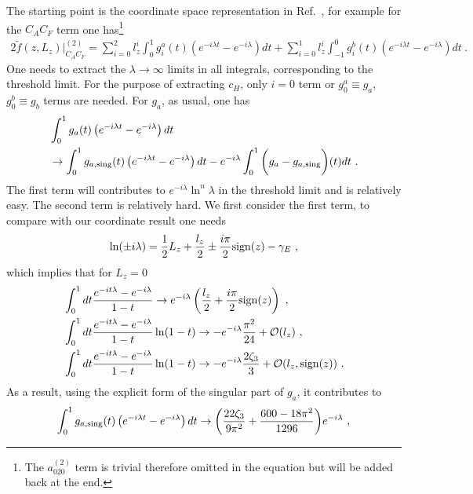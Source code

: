 \documentclass[a4paper,11pt]{article}
\begin{document}
The starting point is the coordinate space representation in Ref.~\cite{Li:2020xml}, for example for the $C_AC_F$ term one has\footnote{The $a_{020}^{(2)}$ term is trivial therefore omitted in the equation but will be added back at the end.}
\begin{align}
2\tilde f(z,L_z)|_{C_AC_F}^{(2)}=\sum_{i=0}^2l_z^i\int_{0}^1 g_i^a(t)\left(e^{-i\lambda t}-e^{-i\lambda}\right)dt+\sum_{i=0}^1l_z^i\int_{-1}^0 g_i^b(t)\left(e^{-i\lambda t}-e^{-i\lambda}\right)dt \ .
\end{align}
One needs to extract the $\lambda \rightarrow \infty$ limits in all integrals, corresponding to the threshold limit. For the purpose of extracting $c_H$, only $i=0$ term or $g^{a}_0\equiv g_a$, $g^{b}_0 \equiv g_b$ terms are needed. For $g_a$, as usual, one has
\begin{align}
&\int_{0}^1 g_a(t)\left(e^{-i\lambda t}-e^{-i\lambda}\right)dt\nonumber \\ 
&\rightarrow \int_{0}^1 g_{a,{\rm sing}}(t)\left(e^{-i\lambda t}-e^{-i\lambda}\right)dt-e^{-i\lambda}\int_{0}^1 \bigg(g_{a}-g_{a,{\rm sing}}\bigg)(t)dt \ .
\end{align}
The first term will contributes to $e^{-i\lambda}\ln^n \lambda$ in the  threshold limit and is relatively easy. The second term is relatively hard. We first consider the first term, to compare with our coordinate result one needs
\begin{align}
\ln (\pm i\lambda)=\frac{1}{2}L_z+\frac{l_z}{2} \pm \frac{i\pi}{2}{\rm sign}(z)-\gamma_E \ ,
\end{align}
which implies that for $L_z=0$
\begin{align}
&\int_{0}^{1} dt \frac{e^{-it\lambda}-e^{-i\lambda}}{1-t}\rightarrow e^{-i\lambda} \left(\frac{l_z}{2}+\frac{i\pi}{2}{\rm sign}(z)\right) \ , \\
&\int_{0}^{1} dt \frac{e^{-it\lambda}-e^{-i\lambda}}{1-t}\ln(1-t)\rightarrow -e^{-i\lambda} \frac{\pi^2}{24}+{\cal O}(l_z) \ , \\
&\int_{0}^{1} dt \frac{e^{-it\lambda}-e^{-i\lambda}}{1-t}\ln(1-t)\rightarrow -e^{-i\lambda} \frac{2\zeta_3}{3}+{\cal O}(l_z,{\rm sign}(z)) \ .
\end{align}
As a result, using the explicit form of the singular part of $g_a$, it contributes to
\begin{align}
\int_{0}^1 g_{a,{\rm sing}}(t)\left(e^{-i\lambda t}-e^{-i\lambda}\right)dt \rightarrow \bigg(\frac{22 \zeta_3}{9 \pi ^2}+\frac{600-18 \pi ^2}{1296}\bigg)e^{-i\lambda} \ ,
\end{align}
\end{document}
